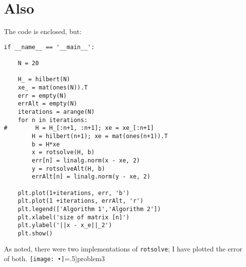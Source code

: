 \documentclass[11pt]{amsart}
\theoremstyle{definition}
\numberwithin{equation}{section}
\begin{document}
\section{Also}
The code is enclosed, but:
\begin{lstlisting}
if __name__ == '__main__':
    
    N = 20
    
    H_ = hilbert(N)
    xe_ = mat(ones(N)).T
    err = empty(N)
    errAlt = empty(N)
    iterations = arange(N)
    for n in iterations:
#        H = H_[:n+1, :n+1]; xe = xe_[:n+1]
        H = hilbert(n+1); xe = mat(ones(n+1)).T
        b = H*xe
        x = rotsolve(H, b)
        err[n] = linalg.norm(x - xe, 2)
        y = rotsolveAlt(H, b)
        errAlt[n] = linalg.norm(y - xe, 2)
    
    plt.plot(1+iterations, err, 'b')
    plt.plot(1 +iterations, errAlt, 'r')
    plt.legend(['Algorithm 1','Algorithm 2'])
    plt.xlabel('size of matrix [n]')
    plt.ylabel('||x - x_e||_2')
    plt.show()
\end{lstlisting}
As noted, there were two implementations of \verb|rotsolve|; I have plotted the error of both.
\texttt{[image: •]}=.5]{problem3}
\end{document}
